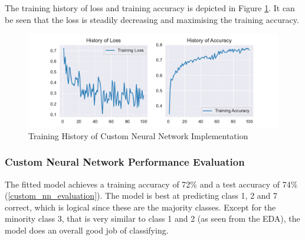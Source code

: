 The training history of loss and training accuracy is depicted in Figure \ref{custom_nn_history}. It can be seen that the loss is steadily decreasing and maximising the training accuracy.
\newline

\begin{figure}[ht]
\centering
\includegraphics[scale=0.8]{figures/custom_nn_training.pdf}
\caption{Training History of Custom Neural Network Implementation}
\label{custom_nn_history}
\end{figure}

\subsubsection{Custom Neural Network Performance Evaluation}
The fitted model achieves a training accuracy of 72\% and a test accuracy of 74\% (\ref{custom_nn_evaluation}). The model is best at predicting class 1, 2 and 7 correct, which is logical since these are the majority classes. Except for the minority class 3, that is very similar to class 1 and 2 (as seen from the EDA), the model does an overall good job of classifying.

